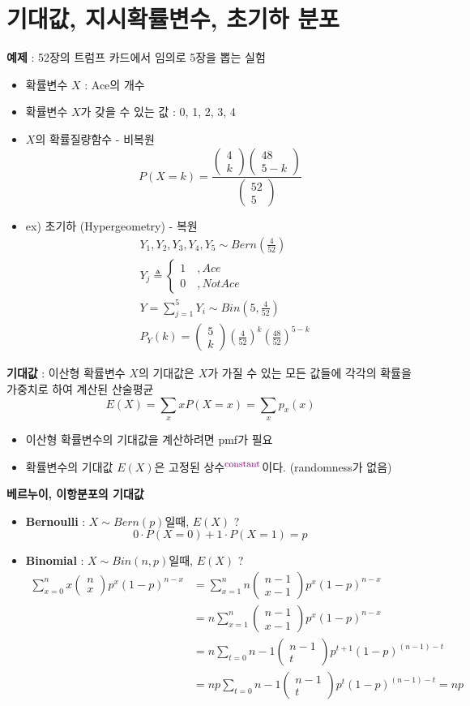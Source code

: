 \documentclass{oblivoir}
\newcommand{\DC}[1]{\textcolor{DarkMagenta}{#1}}%
\newcommand{\UP}[1]{$^{\mbox{\DC{\footnotesize #1}}}$}
\newcommand{\mat}[2]{\begin{pmatrix} #1 \\ #2 \end{pmatrix}}
\begin{document}
\section{기대값, 지시확률변수, 초기하 분포}
\textbf{예제} : 52장의 트럼프 카드에서 임의로 5장을 뽑는 실험
\begin{itemize}
\item 확률변수 $X$ : Ace의 개수
\item 확률변수 $X$가 갖을 수 있는 값 : 0, 1, 2, 3, 4
\item $X$의 확률질량함수 - 비복원
$$
P(X=k) = \frac{\mat{4}{k} \mat{48}{5-k}}{\mat{52}{5}}
$$
\item ex) 초기하 (Hypergeometry) - 복원
\begin{align*}
&Y_1, Y_2, Y_3, Y_4, Y_5 \sim Bern(\frac{4}{52}) \\
&Y_j \triangleq 
\begin{cases}
1\quad ,Ace  \\
0\quad ,Not Ace
\end{cases} \\
&Y = \sum_{j=1}^5 Y_i \sim Bin(5, \frac{4}{52}) \\
&P_Y(k) = \mat{5}{k} \left(\frac{4}{52} \right)^k \left(\frac{48}{52} \right)^{5-k}
\end{align*}
\end{itemize}
\textbf{기대값} : 이산형 확률변수 $X$의 기대값은 $X$가 가질 수 있는 모든 값들에 각각의 확률을 가중치로 하여 계산된 산술평균
$$
E(X) = \sum_x xP(X=x) = \sum_x p_x(x)
$$
\begin{itemize}
\item 이산형 확률변수의 기대값을 계산하려면 pmf가 필요
\item 확률변수의 기대값 $E(X)$은 고정된 상수\UP{constant}이다. (randomness가 없음)
\end{itemize}
\textbf{베르누이, 이항분포의 기대값}
\begin{itemize}
\item \textbf{Bernoulli} : $X \sim Bern(p)$일때, $E(X)$ ?
$$
0 \cdot P(X=0) + 1 \cdot P(X=1) = p
$$
\item \textbf{Binomial} : $X \sim Bin(n,p)$일때, $E(X)$ ?
\begin{align*}
\sum_{x=0}^n x \mat{n}{x} p^x (1-p)^{n-x} &= \sum_{x=1}^n n\mat{n-1}{x-1}p^x(1-p)^{n-x} \\
&= n\sum_{x=1}^n \mat{n-1}{x-1}p^x(1-p)^{n-x} \\
&= n\sum_{t=0}{n-1} \mat{n-1}{t}p^{t+1}(1-p)^{(n-1)-t} \\
&= np\sum_{t=0}{n-1} \mat{n-1}{t}p^{t}(1-p)^{(n-1)-t} = np
\end{align*}
\end{itemize}
\end{document}
